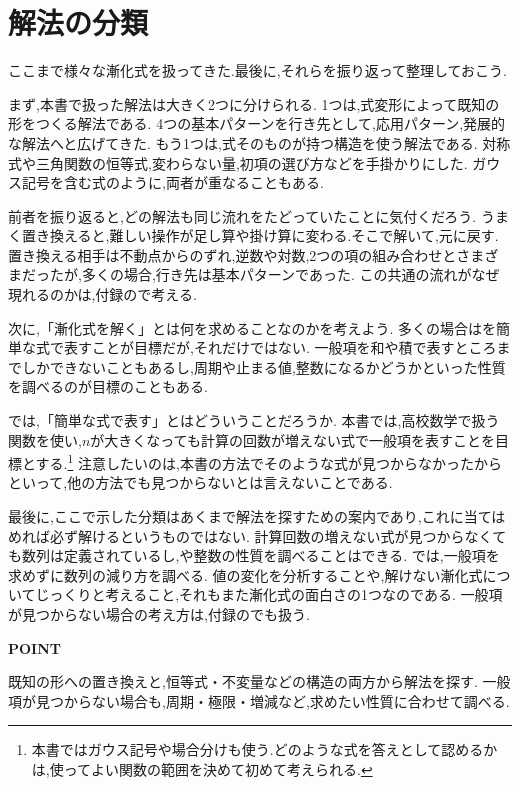 
\section{解法の分類}\label{節：解法の分類}

ここまで様々な漸化式を扱ってきた.最後に,それらを振り返って整理しておこう.

まず,本書で扱った解法は大きく2つに分けられる.
1つは,式変形によって既知の形をつくる解法である.
4つの基本パターンを行き先として,応用パターン,発展的な解法へと広げてきた.
もう1つは,式そのものが持つ構造を使う解法である.
対称式や三角関数の恒等式,変わらない量,初項の選び方などを手掛かりにした.
ガウス記号を含む式のように,両者が重なることもある.
\BookFigClassification

前者を振り返ると,どの解法も同じ流れをたどっていたことに気付くだろう.
うまく置き換えると,難しい操作が足し算や掛け算に変わる.そこで解いて,元に戻す.
置き換える相手は不動点からのずれ,逆数や対数,2つの項の組み合わせとさまざまだったが,多くの場合,行き先は基本パターンであった.
この共通の流れがなぜ現れるのかは,付録ので考える.

次に,「漸化式を解く」とは何を求めることなのかを考えよう.
多くの場合はを簡単な式で表すことが目標だが,それだけではない.
一般項を和や積で表すところまでしかできないこともあるし,周期や止まる値,整数になるかどうかといった性質を調べるのが目標のこともある.

では,「簡単な式で表す」とはどういうことだろうか.
本書では,高校数学で扱う関数を使い,$n$が大きくなっても計算の回数が増えない式で一般項を表すことを目標とする.\footnote{本書ではガウス記号や場合分けも使う.どのような式を答えとして認めるかは,使ってよい関数の範囲を決めて初めて考えられる.}
注意したいのは,本書の方法でそのような式が見つからなかったからといって,他の方法でも見つからないとは言えないことである.

最後に,ここで示した分類はあくまで解法を探すための案内であり,これに当てはめれば必ず解けるというものではない.
計算回数の増えない式が見つからなくても数列は定義されているし,や整数の性質を調べることはできる.
では,一般項を求めずに数列の減り方を調べる.
値の変化を分析することや,解けない漸化式についてじっくりと考えること,それもまた漸化式の面白さの1つなのである.
一般項が見つからない場合の考え方は,付録のでも扱う.

\begin{bookpoint}
  \textbf{POINT}\par
  既知の形への置き換えと,恒等式・不変量などの構造の両方から解法を探す.
  一般項が見つからない場合も,周期・極限・増減など,求めたい性質に合わせて調べる.
\end{bookpoint}
